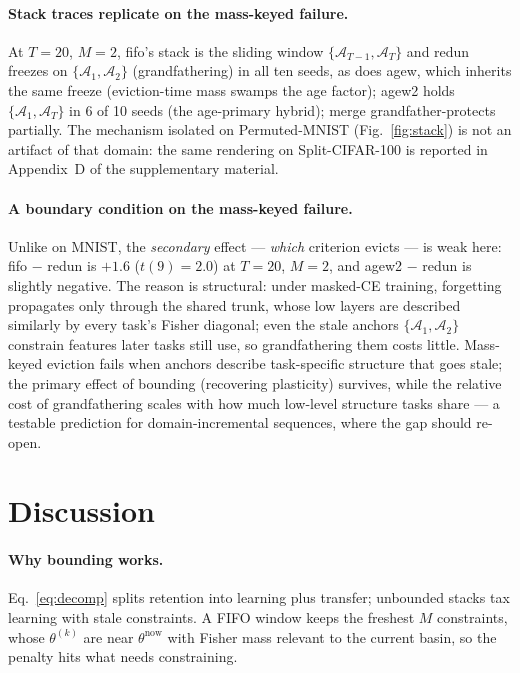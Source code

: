 \documentclass[review,11pt,number]{elsarticle}
\begin{document}
\paragraph{Stack traces replicate on the mass-keyed failure.}
At $T{=}20$, $M{=}2$, fifo's stack is the sliding window
$\{\mathcal{A}_{T-1}, \mathcal{A}_{T}\}$ and redun freezes on
$\{\mathcal{A}_1, \mathcal{A}_2\}$ (grandfathering) in all ten seeds,
as does agew, which inherits the same freeze (eviction-time mass swamps
the age factor); agew2 holds $\{\mathcal{A}_1, \mathcal{A}_{T}\}$ in 6 of
10 seeds (the age-primary hybrid); merge grandfather-protects partially. The mechanism isolated
on Permuted-MNIST (Fig.~\ref{fig:stack}) is not an artifact of that
domain: the same rendering on Split-CIFAR-100 is reported in
Appendix~D of the supplementary material.



\paragraph{A boundary condition on the mass-keyed failure.}
Unlike on MNIST, the \emph{secondary} effect --- \emph{which}
criterion evicts --- is weak here: fifo $-$ redun is $+1.6$
($t(9){=}2.0$) at $T{=}20$, $M{=}2$, and agew2 $-$ redun is slightly
negative. The reason is structural: under masked-CE training,
forgetting propagates only through the shared trunk, whose low layers
are described similarly by every task's Fisher diagonal; even the
stale anchors $\{\mathcal{A}_1, \mathcal{A}_2\}$ constrain features
later tasks still use, so grandfathering them costs little.
Mass-keyed eviction fails when anchors describe task-specific
structure that goes stale; the primary effect of bounding (recovering
plasticity) survives, while the relative cost of grandfathering
scales with how much low-level structure tasks share --- a testable
prediction for domain-incremental sequences, where the gap should
re-open.

\section{Discussion}
\label{sec:discussion}

\paragraph{Why bounding works.}
Eq.~\ref{eq:decomp} splits retention into learning plus transfer; unbounded
stacks tax learning with stale constraints. A FIFO window keeps the freshest
$M$ constraints, whose $\theta^{(k)}$ are near $\theta^{\text{now}}$ with
Fisher mass relevant to the current basin, so the penalty hits what needs
constraining.
\end{document}
